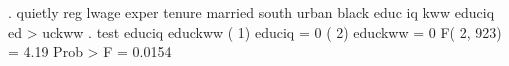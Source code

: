 . quietly reg lwage exper tenure married south urban black educ iq kww educiq ed
> uckww
{\smallskip}
. test educiq educkww
{\smallskip}
 ( 1)  educiq = 0
 ( 2)  educkww = 0
{\smallskip}
       F(  2,   923) =    4.19
            Prob > F =    0.0154
{\smallskip}
